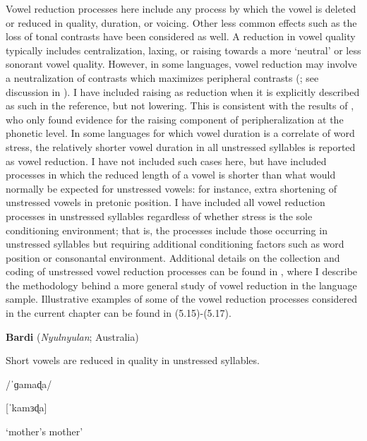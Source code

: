   Vowel reduction processes here include any process by which the vowel is deleted or reduced in quality, duration, or voicing. Other less common effects such as the loss of tonal contrasts have been considered as well. A reduction in vowel quality typically includes centralization, laxing, or raising towards a more ‘neutral’ or less sonorant vowel quality. However, in some languages, vowel reduction may involve a neutralization of contrasts which maximizes peripheral contrasts (\citealt{Crosswhite2001}; see discussion in ). I have included raising as reduction when it is explicitly described as such in the reference, but not lowering. This is consistent with the results of \citet{KapatsinskiEtAl2019}, who only found evidence for the raising component of peripheralization at the phonetic level. In some languages for which vowel duration is a correlate of word stress, the relatively shorter vowel duration in all unstressed syllables is reported as vowel reduction. I have not included such cases here, but have included processes in which the reduced length of a vowel is shorter than what would normally be expected for unstressed vowels: for instance, extra shortening of unstressed vowels in pretonic position. I have included all vowel reduction processes in unstressed syllables regardless of whether stress is the sole conditioning environment; that is, the processes include those occurring in unstressed syllables but requiring additional conditioning factors such as word position or consonantal environment. Additional details on the collection and coding of unstressed vowel reduction processes can be found in , where I describe the methodology behind a more general study of vowel reduction in the language sample. Illustrative examples of some of the vowel reduction processes considered in the current chapter can be found in (5.15)-(5.17).



\ea\label{ex:(5.15)}
  \textbf{Bardi} (\textit{Nyulnyulan}; Australia)



Short vowels are reduced in quality in unstressed syllables.



/\textsf{ˈ}ɡamaɖa/



[\textsf{ˈ}kamɜɖa]



‘mother’s mother’



\citep[88-90]{Bowern2012}
\z



